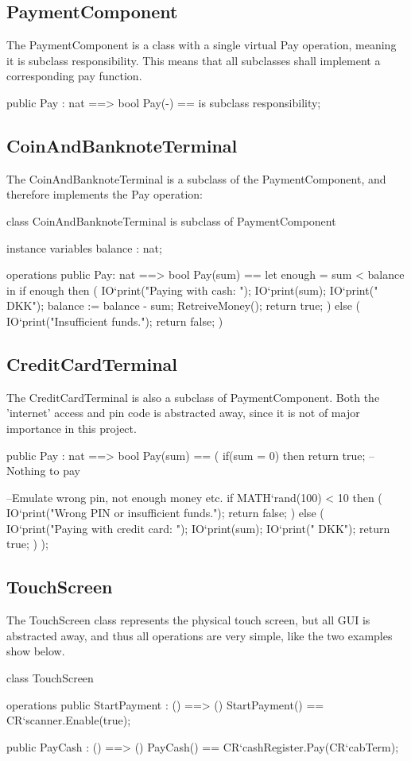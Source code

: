 \subsection{PaymentComponent}
The PaymentComponent is a class with a single virtual Pay operation, meaning it is subclass responsibility. This means that all subclasses shall implement a corresponding pay function.
\begin{vdmpp}
public Pay : nat ==> bool
Pay(-) == is subclass responsibility;
\end{vdmpp}

\subsection{CoinAndBanknoteTerminal}
The CoinAndBanknoteTerminal is a subclass of the PaymentComponent, and therefore implements the Pay operation:
\begin{vdmpp}
class CoinAndBanknoteTerminal is subclass of PaymentComponent

instance variables
 balance : nat;

operations
 public Pay: nat ==> bool
  Pay(sum) ==
   let enough = sum < balance
      in
    if enough then
    (
     IO`print("Paying with cash: ");
     IO`print(sum);
     IO`print(" DKK\n");
     balance := balance - sum;
     RetreiveMoney();
     return true;
    ) else 
    (  
     IO`print("Insufficient funds.\n");
     return false;
    )
\end{vdmpp}

\subsection{CreditCardTerminal}
The CreditCardTerminal is also a subclass of PaymentComponent. Both the 'internet' access and pin code is abstracted away, since it is not of major importance in this project.

\begin{vdmpp}
 public Pay : nat ==> bool
 Pay(sum) ==
 (
  if(sum = 0) then
   return true; -- Nothing to pay
   
 --Emulate wrong pin, not enough money etc.
  if MATH`rand(100) < 10 then 
  (
   IO`print("Wrong PIN or insufficient funds.\n");
   return false;
  ) else 
  (  
   IO`print("Paying with credit card: ");
   IO`print(sum);
   IO`print(" DKK\n");
   return true;
  )
 );	
\end{vdmpp}


\subsection{TouchScreen}
The TouchScreen class represents the physical touch screen, but all GUI is abstracted away, and thus all operations are very simple, like the two examples show below.
\begin{vdmpp}
class TouchScreen

operations
 public StartPayment : () ==> ()
 StartPayment() ==
  CR`scanner.Enable(true);

 public PayCash : () ==> ()
 PayCash() ==
  CR`cashRegister.Pay(CR`cabTerm);
 \end{vdmpp}

